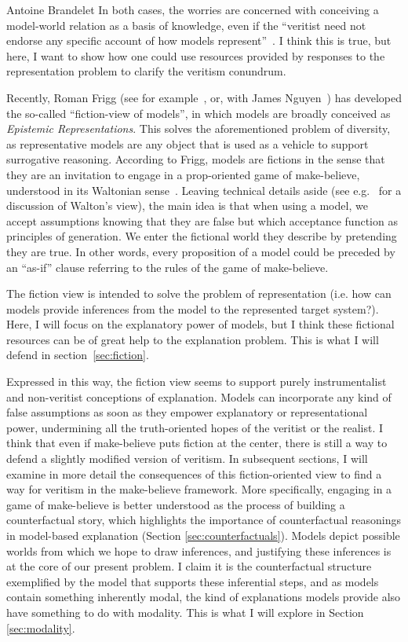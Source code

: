 \begin{artengenv}{Antoine Brandelet}
In both cases, the worries are concerned with conceiving a model-world relation as a basis of knowledge, even if the ``veritist need not endorse any specific account of how models represent''~\parencite{Pincock2021}. I think this is true, but here, I want to show how one could use resources provided by responses to the representation problem to clarify the veritism conundrum.

Recently, Roman Frigg (see for example~\parencite{Frigg2009}, or, with James Nguyen~\parencite{Frigg2016, Frigg2020}) has developed the so-called ``fiction-view of models'', in which models are broadly conceived as \textit{Epistemic Representations}. This solves the aforementioned problem of diversity, as representative models are any object that is used as a vehicle to support surrogative reasoning. According to Frigg, models are fictions in the sense that they are an invitation to engage in a prop-oriented game of make-believe, understood in its Waltonian sense~\parencite{Walton1990}. Leaving technical details aside (see e.g.~\parencite{Toon2012} for a discussion of Walton's view), the main idea is that when using a model, we accept assumptions knowing that they are false but which acceptance function as principles of generation. We enter the fictional world they describe by pretending they are true. In other words, every proposition of a model could be preceded by an ``as-if'' clause referring to the rules of the game of make-believe.

The fiction view is intended to solve the problem of representation (i.e. how can models provide inferences from the model to the represented target system?). Here, I will focus on the explanatory power of models, but I think these fictional resources can be of great help to the explanation problem. This is what I will defend in section~\ref{sec:fiction}.

Expressed in this way, the fiction view seems to support purely instrumentalist and non-veritist conceptions of explanation. Models can incorporate any kind of false assumptions as soon as they empower explanatory or representational power, undermining all the truth-oriented hopes of the veritist or the realist. I think that even if make-believe puts fiction at the center, there is still a way to defend a slightly modified version of veritism. In subsequent sections, I will examine in more detail the consequences of this fiction-oriented view to find a way for veritism in the make-believe framework. More specifically, engaging in a game of make-believe is better understood as the process of building a counterfactual story, which highlights the importance of counterfactual reasonings in model-based explanation (Section \ref{sec:counterfactuals}). Models depict possible worlds from which we hope to draw inferences, and justifying these inferences is at the core of our present problem. I claim it is the counterfactual structure exemplified by the model that supports these inferential steps, and as models contain something inherently modal, the kind of explanations models provide also have something to do with modality. This is what I will explore in Section \ref{sec:modality}.


\end{artengenv}
